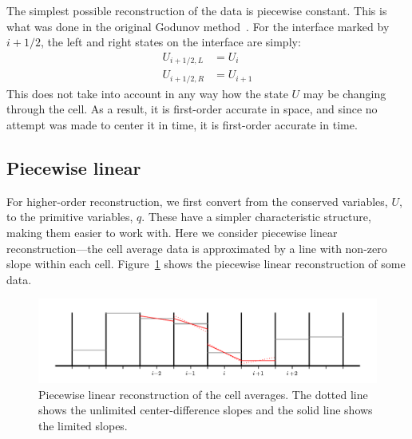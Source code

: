 The simplest possible reconstruction of the data is piecewise constant.
This is what was done in the original Godunov method~\cite{godunov:1959}.  For the interface
marked by $i+1/2$, the left and right states on the interface are simply:
\begin{align}
U_{i+1/2,L} &= U_i \\
U_{i+1/2,R} &= U_{i+1}
\end{align}
This does not take into account in any way how the state $U$ may be changing
through the cell.  As a result, it is first-order accurate in space, and since
no attempt was made to center it in time, it is first-order accurate in time.

\subsection{Piecewise linear}

For higher-order reconstruction, we first convert from the conserved
variables, $U$, to the primitive variables, $q$.  These have a simpler
characteristic structure, making them easier to work with.  Here we
consider piecewise linear reconstruction---the cell average data is
approximated by a line with non-zero slope within each cell.
Figure~\ref{fig:plm} shows the piecewise linear reconstruction of some
data.

\begin{figure}[t]
\centering
\includegraphics[width=\linewidth]{piecewise-linear}
\caption[Piecewise linear reconstruction of cell average
  data]{\label{fig:plm} Piecewise linear reconstruction of the cell
  averages.  The dotted line shows the unlimited center-difference
  slopes and the solid line shows the limited slopes.}
\end{figure}

